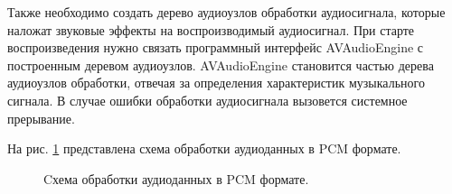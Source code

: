         \par Также необходимо создать дерево аудиоузлов обработки аудиосигнала, которые наложат звуковые эффекты на воспроизводимый аудиосигнал.
        При старте воспроизведения нужно связать программный интерфейс AVAudioEngine с построенным деревом аудиоузлов.
        AVAudioEngine становится частью дерева аудиоузлов обработки, отвечая за определения характеристик музыкального сигнала.
        В случае ошибки обработки аудиосигнала вызовется системное прерывание.

        \par На рис. \ref{fig:handler-pcm-format} представлена схема обработки аудиоданных в PCM формате.
        \begin{figure}[!h]
            \caption{Cхема обработки аудиоданных в PCM формате.}
            \label{fig:handler-pcm-format}
        \end{figure}

